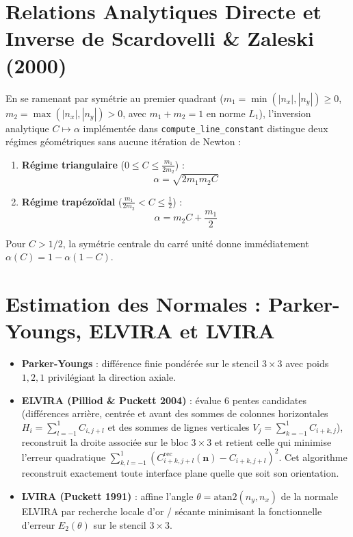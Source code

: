 \documentclass[10pt,a4paper,oneside]{book}
\begin{document}
\section{Relations Analytiques Directe et Inverse de Scardovelli \& Zaleski (2000)}
En se ramenant par symétrie au premier quadrant ($m_1 = \min(|n_x|, |n_y|) \ge 0$, $m_2 = \max(|n_x|, |n_y|) > 0$, avec $m_1 + m_2 = 1$ en norme $L_1$), l'inversion analytique $C \mapsto \alpha$ implémentée dans \texttt{compute\_line\_constant} distingue deux régimes géométriques sans aucune itération de Newton :
\begin{enumerate}
  \item \textbf{Régime triangulaire} ($0 \le C \le \frac{m_1}{2 m_2}$) :
  \begin{equation}
    \alpha = \sqrt{2 m_1 m_2 C}
  \end{equation}
  \item \textbf{Régime trapézoïdal} ($\frac{m_1}{2 m_2} < C \le \frac{1}{2}$) :
  \begin{equation}
    \alpha = m_2 C + \frac{m_1}{2}
  \end{equation}
\end{enumerate}
Pour $C > 1/2$, la symétrie centrale du carré unité donne immédiatement $\alpha(C) = 1 - \alpha(1 - C)$.

\section{Estimation des Normales : Parker-Youngs, ELVIRA et LVIRA}
\begin{itemize}
  \item \textbf{Parker-Youngs} : différence finie pondérée sur le stencil $3\times 3$ avec poids $1, 2, 1$ privilégiant la direction axiale.
  \item \textbf{ELVIRA (Pilliod \& Puckett 2004)} : évalue 6 pentes candidates (différences arrière, centrée et avant des sommes de colonnes horizontales $H_i = \sum_{l=-1}^1 C_{i, j+l}$ et des sommes de lignes verticales $V_j = \sum_{k=-1}^1 C_{i+k, j}$), reconstruit la droite associée sur le bloc $3\times 3$ et retient celle qui minimise l'erreur quadratique $\sum_{k,l=-1}^1 (C^{\text{rec}}_{i+k,j+l}(\mathbf{n}) - C_{i+k,j+l})^2$. Cet algorithme reconstruit exactement toute interface plane quelle que soit son orientation.
  \item \textbf{LVIRA (Puckett 1991)} : affine l'angle $\theta = \text{atan2}(n_y, n_x)$ de la normale ELVIRA par recherche locale d'or / sécante minimisant la fonctionnelle d'erreur $E_2(\theta)$ sur le stencil $3\times 3$.
\end{itemize}
\end{document}
